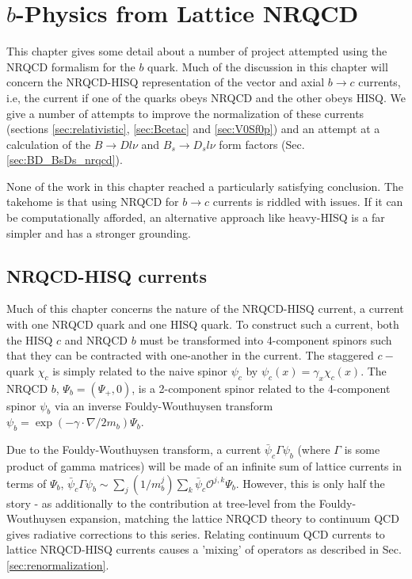 \chapter{$b$-Physics from Lattice NRQCD}

This chapter gives some detail about a number of project attempted using the NRQCD formalism for the $b$ quark. Much of the discussion in this chapter will concern the NRQCD-HISQ representation of the vector and axial $b\to c$ currents, i.e, the current if one of the quarks obeys NRQCD and the other obeys HISQ. We give a number of attempts to improve the normalization of these currents (sections \ref{sec:relativistic}, \ref{sec:Bcetac} and \ref{sec:V0Sf0p}) and an attempt at a calculation of the $B\to Dl\nu$ and $B_s\to D_s l\nu$ form factors (Sec. \ref{sec:BD_BsDs_nrqcd}).

None of the work in this chapter reached a particularly satisfying conclusion. The takehome is that using NRQCD for $b \to c$ currents is riddled with issues. If it can be computationally afforded, an alternative approach like heavy-HISQ is a far simpler and has a stronger grounding.

\section{NRQCD-HISQ currents}

Much of this chapter concerns the nature of the NRQCD-HISQ current, a current with one NRQCD quark and one HISQ quark. To construct such a current, both the HISQ $c$ and NRQCD $b$ must be transformed into 4-component spinors such that they can be contracted with one-another in the current. The staggered $c-$quark $\chi_c$ is simply related to the naive spinor $\psi_c$ by $\psi_c(x)=\gamma_x \chi_c(x)$. The NRQCD $b$, $\Psi_{b} = ( \Psi_+, 0 )$, is a 2-component spinor related to the 4-component spinor $\psi_b$ via an inverse Fouldy-Wouthuysen transform $\psi_b = \exp( - \gamma\cdot \nabla / 2m_b )\Psi_b$.

Due to the Fouldy-Wouthuysen transform, a current $\bar{\psi}_c \Gamma \psi_b$ (where $\Gamma$ is some product of gamma matrices) will be made of an infinite sum of lattice currents in terms of $\Psi_b$, $\bar{\psi}_c \Gamma \psi_b \sim \sum_j (1/m_b^j) \sum_k \bar{\psi}_c \mathcal{O}^{j,k} \Psi_b$. However, this is only half the story - as additionally to the contribution at tree-level from the Fouldy-Wouthuysen expansion, matching the lattice NRQCD theory to continuum QCD gives radiative corrections to this series. Relating continuum QCD currents to lattice NRQCD-HISQ currents causes a 'mixing' of operators as described in Sec. \ref{sec:renormalization}.

